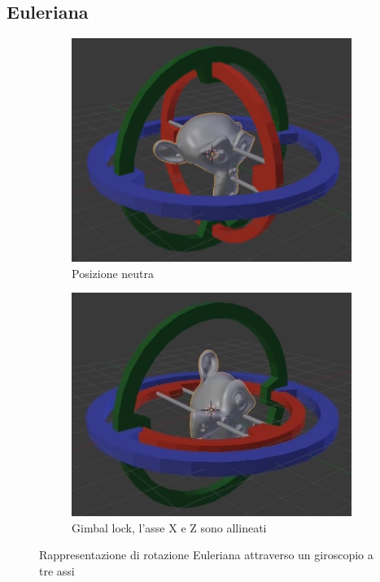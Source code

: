 \subsection{Euleriana}

\begin{figure}
\centering
\begin{subfigure}{.5\textwidth}
  \centering
  \includegraphics[width=.9\linewidth]{Figures/euler-1.jpg}
  \caption{Posizione neutra}
  \label{fig:sub1}
\end{subfigure}%
\begin{subfigure}{.5\textwidth}
  \centering
  \includegraphics[width=.9\linewidth]{Figures/euler-2.jpg}
  \caption{Gimbal lock, l'asse X e Z sono allineati}
  \label{fig:sub2}
\end{subfigure}
\decoRule
\caption[Rotazione Euleriana]{Rappresentazione di rotazione Euleriana attraverso un giroscopio a tre assi}
\label{fig:euler1}
\end{figure}


